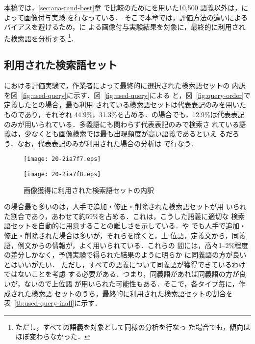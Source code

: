 \documentclass[japanese]{jnlp_1.4}
\newcommand{\evaB}{}
\newcommand{\evaR}{}
\newcommand{\added}{}
\newcommand{\fixed}{}
\newcommand{\sel}{}
\newcommand{\refsec}[1]{}
\newcommand{\MAJOR}{}
\newcommand{\MINOR}{}
\newcommand{\MONO}{}
\begin{document}
本稿では，\ref{sec:ana-rand-best}章
で比較のために\evaB{}を用いた10,500 語義以外は，\evaR{}によって画像付与実験
を行なっている．
そこで本章では，評価方法の違いによるバイアスを避けるため，\evaR{}に
よる画像付与実験結果を対象に，最終的に利用された検索語を分析する
\footnote{ただし，すべての語義を対象として同様の分析を行なっ
た場合でも，傾向はほぼ変わらなかった．}．


\subsection{利用された検索語セット}
\label{sec:ana-query}

\evaR{}における評価実験で，作業者によって最終的に選択された検索語セットの
内訳を図~\ref{fig:used-query}に示す．図~\ref{fig:used-query}による
と，図~\ref{fig:query-order}で定義した\MONO{}と\MAJOR{}の場合，最も利用
されている検索語セットは代表表記のみを用いたものであり，それぞれ
44.9\%，31.3\%を占める．\MINOR{}の場合でも，12.9\%は代表表記のみが用いられている．多義語にも関わらず代表表記のみで検索さ
れている語義は，少なくとも画像検索では最も出現頻度が高い語義であるといえ
るだろう．なお，代表表記のみが利用された場合の分析は
\refsec{sec:judge-major}で行なう．

\begin{figure}[b]
\begin{minipage}{212pt}
\texttt{[image: 20-2ia7f7.eps]} 
\caption{画像獲得に利用された検索語セットの内訳}
\label{fig:used-query}
\end{minipage}
\hfill
\begin{minipage}{188pt}
\setlength{\captionwidth}{188pt}
\begin{center}
\texttt{[image: 20-2ia7f8.eps]} 
\end{center}
\hangcaption{図~\ref{fig:used-query}の作業者による\added{}，\fixed{}，\sel{}で利用された検索語の内訳}
\label{fig:used-query-fixed}
\end{minipage}
\end{figure}

\MINOR{}の場合最も多いのは，人手で追加・修正・削除された検索語セットが用
いられた割合であり，あわせて約59\%を占める．これは，こうした語義に適切な
検索語セットを自動的に用意することの難しさを示している．\MONO{}や
\MAJOR{}でも人手で追加・修正・削除された場合は多いが，それらを除くと，上
位語，定義文から，同義語，例文からの情報が，よく用いられている．これらの
間には，高々1--2\%程度の差分しかなく，予備実験で得られた結果のように明らか
に同義語の方が良いとはいいがたい．
ただし，すべての語義について同義語が獲得できているわけではないことを考慮
する必要がある．つまり，同義語があれば同義語の方が良いが，ないので上位語
が用いられた可能性もある．そこで，各タイプ毎に，作成された検索語
セットのうち，最終的に利用された検索語セットの割合を
表~\ref{tb:used-query-inall}に示す．
\end{document}
